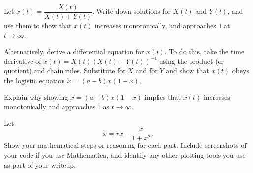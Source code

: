 \documentclass[12pt,letterpaper]{exam}
\begin{document}
\begin{questions}
\begin{parts}
\item Let $x(t) = \dfrac{X(t)}{X(t)+Y(t)}$.  Write down solutions for $X(t)$ and $Y(t)$, and use them to show that $x(t)$ increases monotonically, and approaches $1$ at $t\rightarrow\infty$.
\item Alternatively, derive a differential equation for $x(t)$.  To do this, take the time derivative of $x(t) = X(t)(X(t)+Y(t))^{-1}$ using the product (or quotient) and chain rules.  Substitute for $\dot X$ and for $\dot Y$ and show that $x(t)$ obeys the logistic equation $\dot x = (a-b)x(1-x)$.
\item Explain why showing $\dot x = (a-b)x(1-x)$ implies that $x(t)$ increases monotonically and approaches $1$ as $t\rightarrow \infty$.
\end{parts}

\question Let \[\dot{x} = rx - \frac{x}{1+x^2}.\]
Show your mathematical steps or reasoning for each part.  Include screenshots of your code if you use Mathematica, and identify any other plotting tools you use as part of your writeup.





\end{questions}
\end{document}
